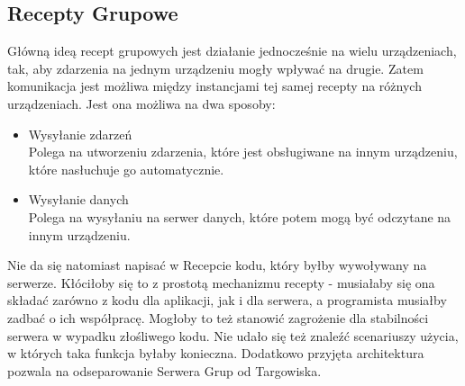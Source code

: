 \documentclass[11pt,a4paper,polish,thesis]{dcsbook}
\begin{document}
\subsection{Recepty Grupowe}
Główną ideą recept grupowych jest działanie jednocześnie na wielu urządzeniach, tak, aby zdarzenia na jednym urządzeniu mogły wpływać na drugie. Zatem komunikacja jest możliwa między instancjami  tej samej recepty na różnych urządzeniach. Jest ona możliwa na dwa sposoby:
\begin{itemize}
\item{Wysyłanie zdarzeń}\\
Polega na utworzeniu zdarzenia, które jest obsługiwane na innym urządzeniu, które nasłuchuje go automatycznie.
\item{Wysyłanie danych}\\
Polega na wysyłaniu na serwer danych, które potem mogą być odczytane na innym urządzeniu.
\end{itemize}
Nie da się natomiast napisać w Recepcie kodu, który byłby wywoływany na serwerze. Kłóciłoby się to z prostotą mechanizmu recepty - musiałaby się ona składać zarówno z kodu dla aplikacji, jak i dla serwera, a programista musiałby zadbać o ich współpracę. Mogłoby to też stanowić zagrożenie dla stabilności serwera w wypadku złośliwego kodu.
Nie udało się też znaleźć scenariuszy użycia, w których taka funkcja byłaby konieczna. Dodatkowo przyjęta architektura pozwala na odseparowanie Serwera Grup od Targowiska. 
\end{document}
